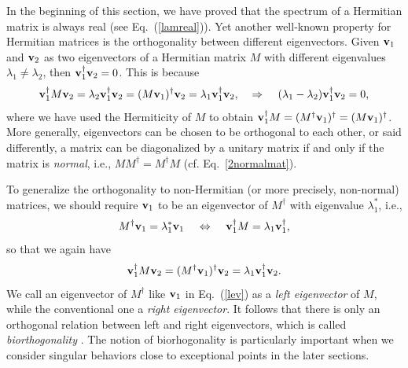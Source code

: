 \documentclass{tADP2e}
\theoremstyle{plain}
\theoremstyle{plain}
\theoremstyle{definition}
\begin{document}
\vspace{3pt}
\noindent
In the beginning of this section, we have proved that the spectrum of a Hermitian matrix is always real (see Eq.~(\ref{lamreal})). Yet another well-known property for Hermitian matrices is the orthogonality between different eigenvectors. Given $\bold{v}_1$ and $\bold{v}_2$ as two eigenvectors of a Hermitian matrix $M$ with different eigenvalues $\lambda_1\neq\lambda_2$, then $\bold{v}_1^\dag\bold{v}_2=0$. This is because
\begin{equation}
\bold{v}_1^\dag M\bold{v}_2=\lambda_2\bold{v}_1^\dag\bold{v}_2=(M\bold{v}_1)^\dag\bold{v}_2=\lambda_1\bold{v}_1^\dag\bold{v}_2,\;\;\;\;
\Rightarrow\;\;\;\;(\lambda_1-\lambda_2)\bold{v}_1^\dag\bold{v}_2=0,
\end{equation}
where we have used the Hermiticity of $M$ to obtain $\bold{v}_1^\dag M=(M^\dag \bold{v}_1)^\dag=(M \bold{v}_1)^\dag$. 
More generally, eigenvectors can be chosen to be orthogonal to each other, or said differently, a matrix can be diagonalized by a unitary matrix if and only if the matrix is {\it normal}, i.e., $MM^\dagger=M^\dagger M$ (cf. Eq.~\eqref{2normalmat}). 


To generalize the orthogonality to non-Hermitian (or more precisely, non-normal) matrices, we should require $\bold{v}_1$ to be an eigenvector of $M^\dag$ with eigenvalue $\lambda_1^*$, i.e.,
\begin{equation}
M^\dag\bold{v}_1=\lambda_1^*\bold{v}_1\;\;\;\;\Leftrightarrow\;\;\;\;\bold{v}_1^\dag M=\lambda_1\bold{v}_1^\dag,
\label{lev}
\end{equation}
so that we again have
\begin{equation}
\bold{v}_1^\dag M\bold{v}_2=(M^\dag\bold{v}_1)^\dag\bold{v}_2=\lambda_1\bold{v}_1^\dag\bold{v}_2.
\end{equation}
We call an eigenvector of $M^\dag$ like $\bold{v}_1$ in Eq.~(\ref{lev}) as a \emph{left eigenvector} of $M$, while the conventional one a \emph{right eigenvector}. It follows that there is only an orthogonal relation between left and right eigenvectors, which is called \emph{biorthogonality} \cite{BS87}. The notion of biorhogonality is particularly important when we consider singular behaviors close to exceptional points in the later sections.
\end{document}

